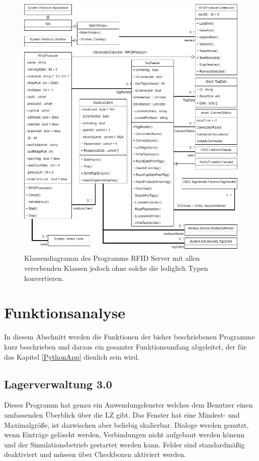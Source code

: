\begin{figure}
    \caption[Klassendiagramm des Programms RFID Server ]
    {\small Klassendiagramm des Programms RFID Server mit allen vererbenden Klassen jedoch ohne solche die
    lediglich Typen konvertieren.}\label{fig:figure8}
    \includegraphics[width = \textwidth ]{Bilder/RFID_Klassendiagramm}
    \centering
\end{figure}

\newpage
\section{Funktionsanalyse}
In diesem Abschnitt werden die Funktionen der bisher beschriebenen Programme kurz beschrieben und daraus ein gesamter
Funktionsumfang abgeleitet, der für das Kapitel \ref{PythonApp} dienlich sein wird.

\subsection{Lagerverwaltung 3.0}
Dieses Programm hat genau ein Anwendungsfenster welches dem Benutzer einen umfassenden Überblick über die LZ gibt.
Das Fenster hat eine Mindest- und Maximalgröße, ist dazwischen aber beliebig skalierbar. Dialoge werden genutzt, wenn
Einträge gelöscht werden, Verbindungen nicht aufgebaut werden könenn und der Simulationsbetrieb gestartet werden kann.
Felder sind standardmäßig deaktiviert und müssen über Checkboxen aktiviert werden. \\

